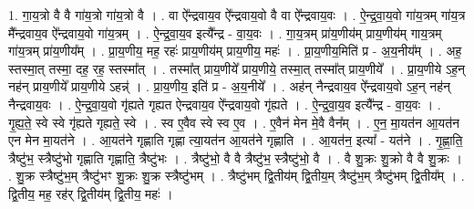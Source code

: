 \documentclass[17pt]{extarticle}
\begin{document}
1. गा॒य॒त्रो वै वै गा॑य॒त्रो गा॑य॒त्रो वै । . वा ऐ᳚न्द्रवाय॒व ऐ᳚न्द्रवाय॒वो वै वा ऐ᳚न्द्रवाय॒वः । . ऐ॒न्द्र॒वा॒य॒वो गा॑य॒त्रम् गा॑य॒त्र मै᳚न्द्रवाय॒व ऐ᳚न्द्रवाय॒वो गा॑य॒त्रम् । . ऐ॒न्द्र॒वा॒य॒व इत्यै᳚न्द्र - वा॒य॒वः । . गा॒य॒त्रम् प्रा॑य॒णीय॑म् प्राय॒णीय॑म् गाय॒त्रम् गा॑य॒त्रम् प्रा॑य॒णीय᳚म् । . प्रा॒य॒णीय॒ मह॒ रहः॑ प्राय॒णीय॑म् प्राय॒णीय॒ महः॑ । . प्रा॒य॒णीय॒मिति॑ प्र - अ॒य॒नीय᳚म् । . अह॒ स्तस्मा॒त् तस्मा॒ दह॒ रह॒ स्तस्मा᳚त् । . तस्मा᳚त् प्राय॒णीये᳚ प्राय॒णीये॒ तस्मा॒त् तस्मा᳚त् प्राय॒णीये᳚ । . प्रा॒य॒णीये ऽह॒न् नह॑न् प्राय॒णीये᳚ प्राय॒णीये ऽहन्न्॑ । . प्रा॒य॒णीय॒ इति॑ प्र - अ॒य॒नीये᳚ । . अह॑न् नैन्द्रवाय॒व ऐ᳚न्द्रवाय॒वो ऽह॒न् नह॑न् नैन्द्रवाय॒वः । . ऐ॒न्द्र॒वा॒य॒वो गृ॑ह्यते गृह्यत ऐन्द्रवाय॒व ऐ᳚न्द्रवाय॒वो गृ॑ह्यते । . ऐ॒न्द्र॒वा॒य॒व इत्यै᳚न्द्र - वा॒य॒वः । . गृ॒ह्य॒ते॒ स्वे स्वे गृ॑ह्यते गृह्यते॒ स्वे । . स्व ए॒वैव स्वे स्व ए॒व । . ए॒वैन॑ मेन मे॒वै वैन᳚म् । . ए॒न॒ मा॒यत॑न आ॒यत॑न एन मेन मा॒यत॑ने । . आ॒यत॑ने गृह्णाति गृह्णा त्या॒यत॑न आ॒यत॑ने गृह्णाति । . आ॒यत॑न॒ इत्या᳚ - यत॑ने । . गृ॒ह्णा॒ति॒ त्रैष्टु॑भ॒ स्त्रैष्टु॑भो गृह्णाति गृह्णाति॒ त्रैष्टु॑भः । . त्रैष्टु॑भो॒ वै वै त्रैष्टु॑भ॒ स्त्रैष्टु॑भो॒ वै । . वै शु॒क्रः शु॒क्रो वै वै शु॒क्रः । . शु॒क्र स्त्रैष्टु॑भ॒म् त्रैष्टु॑भꣳ शु॒क्रः शु॒क्र स्त्रैष्टु॑भम् । . त्रैष्टु॑भम् द्वि॒तीय॑म् द्वि॒तीय॒म् त्रैष्टु॑भ॒म् त्रैष्टु॑भम् द्वि॒तीय᳚म् । . द्वि॒तीय॒ मह॒ रह॑र् द्वि॒तीय॑म् द्वि॒तीय॒ महः॑ । \newline
\end{document}
